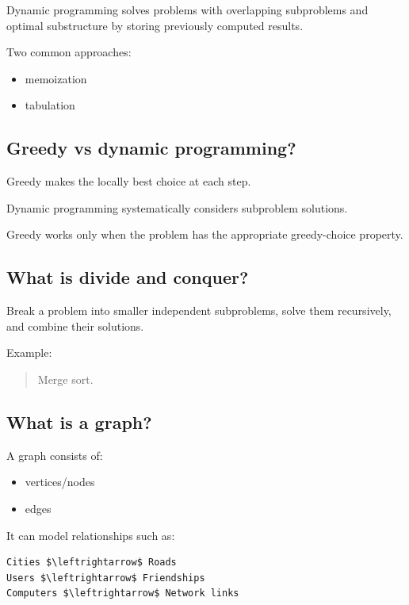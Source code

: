 Dynamic programming solves problems with overlapping subproblems and optimal substructure by storing previously computed results.

Two common approaches:

\begin{itemize}
  \item memoization
  \item tabulation
\end{itemize}

\medskip

\subsection{Greedy vs dynamic programming?}

Greedy makes the locally best choice at each step.

Dynamic programming systematically considers subproblem solutions.

Greedy works only when the problem has the appropriate greedy-choice property.

\medskip

\subsection{What is divide and conquer?}

Break a problem into smaller independent subproblems, solve them recursively, and combine their solutions.

Example:

\begin{quote}
Merge sort.\\
\end{quote}

\medskip

\subsection{What is a graph?}

A graph consists of:

\begin{itemize}
  \item vertices/nodes
  \item edges
\end{itemize}

It can model relationships such as:

\begin{lstlisting}
Cities $\leftrightarrow$ Roads
Users $\leftrightarrow$ Friendships
Computers $\leftrightarrow$ Network links
\end{lstlisting}

